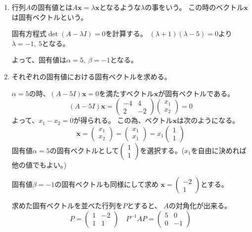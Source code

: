 \documentclass[12pt,b5paper]{ltjsarticle}
\begin{document}
\begin{enumerate}
 \item
      行列$A$の固有値とは$A\bm{x}=\lambda\bm{x}$となるような$\lambda$の事をいう。
      この時のベクトル$\bm{x}$は固有ベクトルという。

      固有方程式$\det(A-\lambda I)=0$を計算する。
      $(\lambda +1)(\lambda -5)=0$より$\lambda= -1, \ 5$となる。

      よって、固有値は$\alpha =5,\ \beta = -1$となる。

      \dotfill
 \item
      それぞれの固有値における固有ベクトルを求める。

      $\alpha =5$の時、$(A-5 I)\bm{x}=0$を満たすベクトル$\bm{x}$が固有ベクトルである。
      \begin{equation}
       (A-5 I)\bm{x}=
       \begin{pmatrix} -4 & 4 \\ 2 & -2 \end{pmatrix}\begin{pmatrix} x_1 \\ x_2 \end{pmatrix}
       =0
      \end{equation}
      よって、$x_1-x_2=0$が得られる。
      この為、ベクトル$\bm{x}$は次のようになる。
      \begin{equation}
       \bm{x}=\begin{pmatrix} x_1 \\ x_2 \end{pmatrix}=\begin{pmatrix} x_1 \\ x_1 \end{pmatrix}=x_1\begin{pmatrix} 1 \\ 1 \end{pmatrix}
      \end{equation}
      固有値$\alpha =5$の固有ベクトルとして$\begin{pmatrix} 1 \\ 1 \end{pmatrix}$を選択する。($x_1$を自由に決めれば他の値でもよい。)

      固有値$\beta =-1$の固有ベクトルも同様にして求め
      $\bm{x}=\begin{pmatrix} -2 \\ 1 \end{pmatrix}$とする。

      求めた固有ベクトルを並べた行列を$P$とすると、
      $A$の対角化が出来る。
      \begin{equation}
       P=\begin{pmatrix} 1 & -2 \\ 1 & 1 \end{pmatrix}
       \quad
        P^{-1}AP= \begin{pmatrix} 5 & 0 \\ 0 & -1 \end{pmatrix}
      \end{equation}


\end{enumerate}
\end{document}

